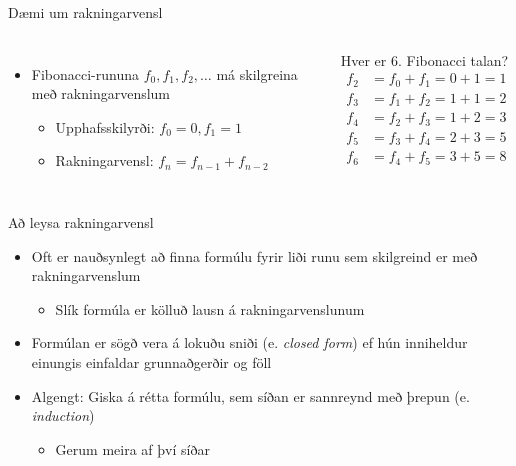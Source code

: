 \documentclass[handout]{beamer}
\begin{document}
\begin{frame}{Dæmi um rakningarvensl}
    \begin{columns}
        \begin{itemize}
            \item Fibonacci-rununa $f_0, f_1, f_2, \ldots$ má skilgreina með rakningarvenslum
            \begin{itemize}
                \item Upphafsskilyrði: $f_0 = 0, f_1 = 1$
                \item Rakningarvensl: $f_n = f_{n-1} + f_{n-2}$
            \end{itemize}
        \end{itemize}
        Hver er 6. Fibonacci talan? \pause
        \begin{align*}
            f_2 &= f_0 + f_1 = 0 + 1 = 1\\
            f_3 &= f_1 + f_2 = 1 + 1 = 2\\
            f_4 &= f_2 + f_3 = 1 + 2 = 3\\
            f_5 &= f_3 + f_4 = 2 + 3 = 5\\
            f_6 &= f_4 + f_5 = 3 + 5 = 8\\
        \end{align*}
    \end{columns}
\end{frame}

\begin{frame}{Að leysa rakningarvensl}
\begin{itemize}
    \item Oft er nauðsynlegt að finna formúlu fyrir liði runu sem skilgreind er með rakningarvenslum
    \begin{itemize}
        \item Slík formúla er kölluð lausn á rakningarvenslunum
    \end{itemize}
    \item Formúlan er sögð vera á lokuðu sniði (e. \emph{closed form}) ef hún inniheldur einungis einfaldar grunnaðgerðir og föll
    \item Algengt: Giska á rétta formúlu, sem síðan er sannreynd með þrepun (e. \emph{induction})
    \begin{itemize}
        \item Gerum meira af því síðar
    \end{itemize}
\end{itemize}
\end{frame}
\end{document}
